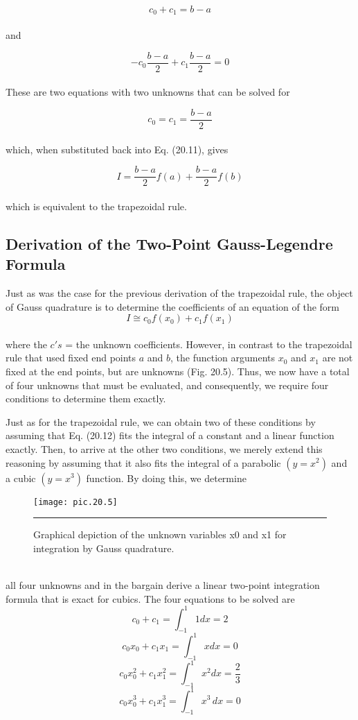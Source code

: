 \documentclass[../main.tex]{subfiles}
\begin{document}
	$$c_0 + c_1 = b-a$$\\
and

	$$-c_0 \dfrac{b-a}{2} + c_1 \dfrac{b-a}{2} = 0$$\\
These are two equations with two unknowns that can be solved for

	$$c_0= c_1 = \dfrac{b-a}{2}$$\\
which, when substituted back into Eq. (20.11), gives

	$$I= \dfrac{b-a}{2} f(a) + \dfrac{b-a}{2} f(b)$$\\
which is equivalent to the trapezoidal rule.

\subsection{Derivation of the Two-Point Gauss-Legendre Formula}
Just as was the case for the previous derivation of the trapezoidal rule, the object of Gauss
quadrature is to determine the coefficients of an equation of the form
\vspace{0.4in}
\begin{equation}
	\tag{20.12}
	I\cong c_0 f(x_0)+c_1 f(x_1)
\end{equation}\\
where the $c's$ = the unknown coefficients. However, in contrast to the trapezoidal rule that
used fixed end points $a$ and $b$, the function arguments $x_0$ and $x_1$ are not fixed at the end
points, but are unknowns (Fig. 20.5). Thus, we now have a total of four unknowns that
must be evaluated, and consequently, we require four conditions to determine them exactly.

Just as for the trapezoidal rule, we can obtain two of these conditions by assuming
that Eq. (20.12) fits the integral of a constant and a linear function exactly. Then, to arrive at
the other two conditions, we merely extend this reasoning by assuming that it also fits the
integral of a parabolic $(y = x^2)$ and a cubic $(y = x^3)$ function. By doing this, we determine
\pagebreak
\begin{figure}[hbt!]
	\centering
	\texttt{[image: pic.20.5]}
	\caption{\textsf{Graphical depiction of the unknown variables x0 and x1 for integration by Gauss quadrature.}} \hrule
	\label{pic.20.5}
\end{figure}\\
all four unknowns and in the bargain derive a linear two-point integration formula that is
exact for cubics. The four equations to be solved are
\begin{equation}
	\tag{20.13}
	c_0+c_1 = \int^{1}_{-1} 1dx = 2
\end{equation}
\begin{equation}
	\tag{20.14}
	c_0 x_0 + c_1 x_1 = \int^{1}_{-1} xdx = 0
\end{equation}
\begin{equation}
	\tag{20.15}
	c_0 x^{2}_{0} + c_1 x^{2}_{1} = \int^{1}_{-1} x^2 dx = \dfrac{2}{3}
\end{equation}
\begin{equation}
	\tag{20.16}
	c_0 x^{3}_{0} + c_1 x^{3}_{1} = \int^{1}_{-1} x^3 \, dx = 0
\end{equation}
\end{document}
